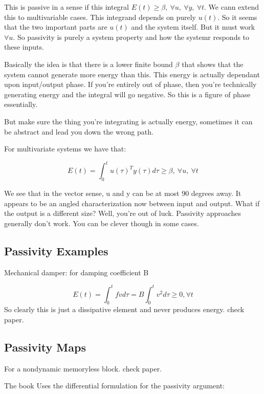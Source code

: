 \documentclass[11pt]{article}
\begin{document}
This is passive in a sense if this integral $E(t) \geq \beta, \ \forall u, \ \forall y, \ \forall t$. We cann extend this to multivariable cases. This integrand depends on purely $u(t)$. So it seems that the two important parts are $u(t)$ and the system itself. But it must work $\forall u$. So passivity is purely a system property and how the systemr responds to these inputs.

Basically the idea is that there is a lower finite bound $\beta$ that shows that the system cannot generate more energy than this. This energy is actually dependant upon input/output phase. If you're entirely out of phase, then you're technically generating energy and the integral will go negative. So this is a figure of phase essentially.

But make sure the thing you're integrating is actually energy, sometimes it can be abstract and lead you down the wrong path.
 
For multivariate systems we have that:

 \begin{equation}
E(t) = \int_0^t u(\tau)^Ty(\tau) d\tau \geq \beta, \ \forall u, \ \forall t
\end{equation}

We see that in the vector sense, u and y can be at most 90 degrees away. It appears to be an angled characterization now between input and output. What if the output is a different size? Well, you're out of luck. Passivity approaches generally don't work. You can be clever though in some cases.

\subsection*{Passivity Examples}
Mechanical damper: for damping coefficient B

\begin{equation}
	E(t) = \int_0^t f v d\tau = B \int_0^t v^2 d\tau \geq 0, \forall t
\end{equation}
So clearly this is just a dissipative element and never produces energy.
 check paper.


\subsection*{Passivity Maps}
 For a nondynamic memoryless block.  check paper.



 The book Uses the differential formulation for the passivity argument:
\end{document}

